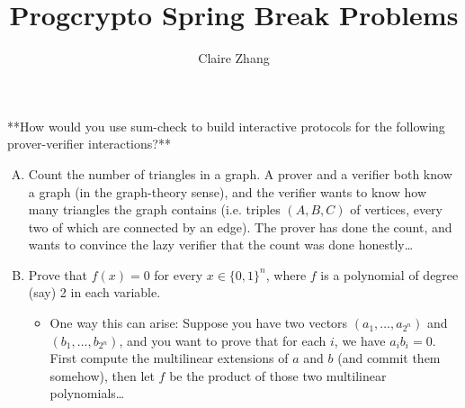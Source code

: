 \documentclass{scrartcl}
\title{Progcrypto Spring Break Problems}
\author{Claire Zhang}
\date{}
\begin{document}
\maketitle
\begin{problem}
    **How would you use sum-check to build interactive protocols for the following prover-verifier interactions?**

    \begin{enumerate}[A.]
        \item 
        Count the number of triangles in a graph.  A prover and a verifier both know a graph (in the graph-theory sense), and the verifier wants to know how many triangles the graph contains (i.e. triples $(A, B, C)$ of vertices, every two of which are connected by an edge).  The prover has done the count, and wants to convince the lazy verifier that the count was done honestly…

        \item 
        Prove that $f(x) = 0$ for every $x \in \{ 0, 1\}^n$, where $f$ is a polynomial of degree (say) 2 in each variable.
        \begin{itemize}
            \item One way this can arise: Suppose you have two vectors $(a_1, \ldots, a_{2^n})$ and $(b_1, \ldots, b_{2^n})$, and you want to prove that for each $i$, we have $a_i b_i = 0$.  First compute the multilinear extensions of $a$ and $b$ (and commit them somehow), then let $f$ be the product of those two multilinear polynomials…
        \end{itemize}
    \end{enumerate}
\end{problem}
\end{document}
